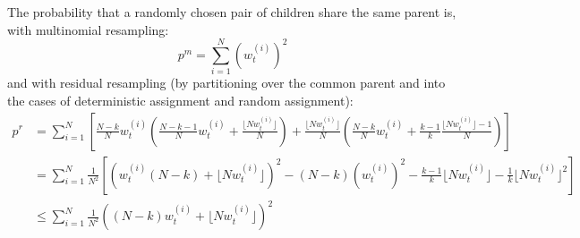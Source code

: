 \documentclass[fleqn]{article}
\newcommand{\wt}[2][t]{w_{#1}^{(#2)}}
\begin{document}
\color{black}
The probability that a randomly chosen pair of children share the same parent is, with multinomial resampling:
\begin{equation*}
p^m = \sum_{i=1}^N (\wt{i})^2
\end{equation*}
and with residual resampling (by partitioning over the common parent and into the cases of deterministic assignment and random assignment):
\begin{align*}
p^r &= \sum_{i=1}^N  \left[ \frac{N-k}{N} \wt{i} \left( \frac{N-k-1}{N} \wt{i} + \frac{\lfloor N\wt{i}\rfloor}{N}\right) + \frac{\lfloor N\wt{i}\rfloor}{N} \left(\frac{N-k}{N} \wt{i} + \frac{k-1}{k} \frac{\lfloor N\wt{i}\rfloor -1}{N} \right) \right] \\
&= \sum_{i=1}^N \frac{1}{N^2} \left[ \left( \wt{i} (N-k) + \lfloor N\wt{i}\rfloor \right)^2 - (N-k) (\wt{i})^2 - \frac{k-1}{k} \lfloor N\wt{i}\rfloor - \frac{1}{k}  \lfloor N\wt{i}\rfloor^2 \right] \\
&\leq \sum_{i=1}^N \frac{1}{N^2} \left( (N-k) \wt{i} + \lfloor N\wt{i}\rfloor \right)^2
\end{align*}


\end{document}
